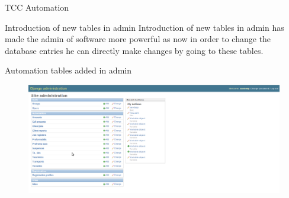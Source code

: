 \newpage
\begin{frame}{TCC Automation}
\begin{block}{Introduction of new tables in admin} Introduction of new tables in admin has made the admin of software more powerful as now in order to change the database entries he can directly make changes by going to these tables.
\end{block}
\end{frame}
\newpage
\begin{frame}{Automation tables added in admin}
\begin{figure}
\label{imag}
\centering
\includegraphics[scale=0.2]{s5.png}
\end{figure}
\end{frame}


